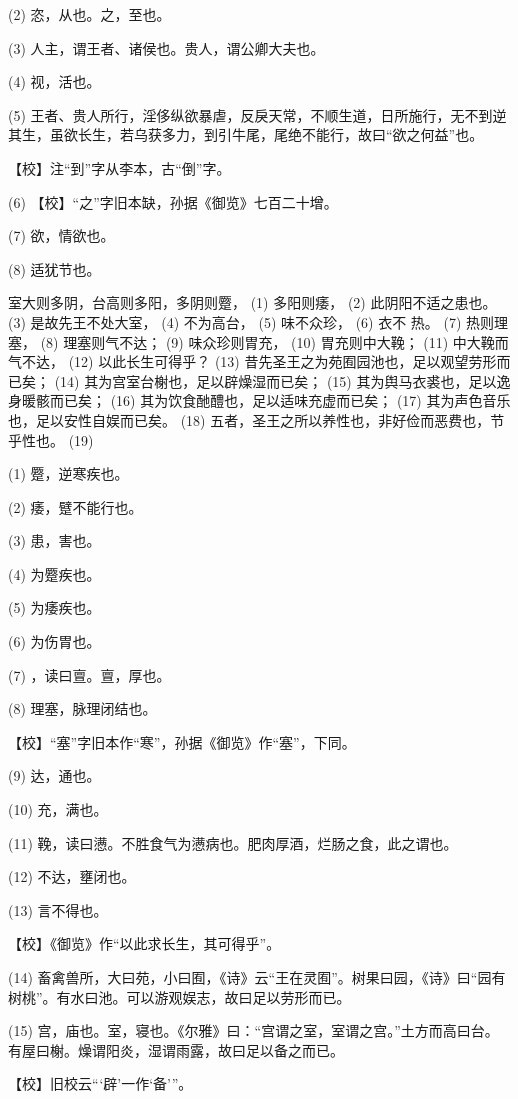 \documentclass[12pt,UTF8]{ctexbook}
\begin{document}
(2) 恣，从也。之，至也。

(3) 人主，谓王者、诸侯也。贵人，谓公卿大夫也。

(4) 视，活也。

(5) 王者、贵人所行，淫侈纵欲暴虐，反戾天常，不顺生道，日所施行，无不到逆其生，虽欲长生，若乌获多力，到引牛尾，尾绝不能行，故曰“欲之何益”也。

【校】注“到”字从李本，古“倒”字。

(6) 【校】“之”字旧本缺，孙据《御览》七百二十增。

(7) 欲，情欲也。

(8) 适犹节也。

室大则多阴，台高则多阳，多阴则蹷， (1) 多阳则痿， (2) 此阴阳不适之患也。 (3) 是故先王不处大室， (4) 不为高台， (5) 味不众珍， (6) 衣不 热。 (7) 热则理塞， (8) 理塞则气不达； (9) 味众珍则胃充， (10) 胃充则中大鞔； (11) 中大鞔而气不达， (12) 以此长生可得乎？ (13) 昔先圣王之为苑囿园池也，足以观望劳形而已矣； (14) 其为宫室台榭也，足以辟燥湿而已矣； (15) 其为舆马衣裘也，足以逸身暖骸而已矣； (16) 其为饮食酏醴也，足以适味充虚而已矣； (17) 其为声色音乐也，足以安性自娱而已矣。 (18) 五者，圣王之所以养性也，非好俭而恶费也，节乎性也。 (19)

(1) 蹷，逆寒疾也。

(2) 痿，躄不能行也。

(3) 患，害也。

(4) 为蹷疾也。

(5) 为痿疾也。

(6) 为伤胃也。

(7) ，读曰亶。亶，厚也。

(8) 理塞，脉理闭结也。

【校】“塞”字旧本作“寒”，孙据《御览》作“塞”，下同。

(9) 达，通也。

(10) 充，满也。

(11) 鞔，读曰懑。不胜食气为懑病也。肥肉厚酒，烂肠之食，此之谓也。

(12) 不达，壅闭也。

(13) 言不得也。

【校】《御览》作“以此求长生，其可得乎”。

(14) 畜禽兽所，大曰苑，小曰囿，《诗》云“王在灵囿”。树果曰园，《诗》曰“园有树桃”。有水曰池。可以游观娱志，故曰足以劳形而已。

(15) 宫，庙也。室，寝也。《尔雅》曰：“宫谓之室，室谓之宫。”土方而高曰台。有屋曰榭。燥谓阳炎，湿谓雨露，故曰足以备之而已。

【校】旧校云“‘辟’一作‘备’”。
\end{document}
